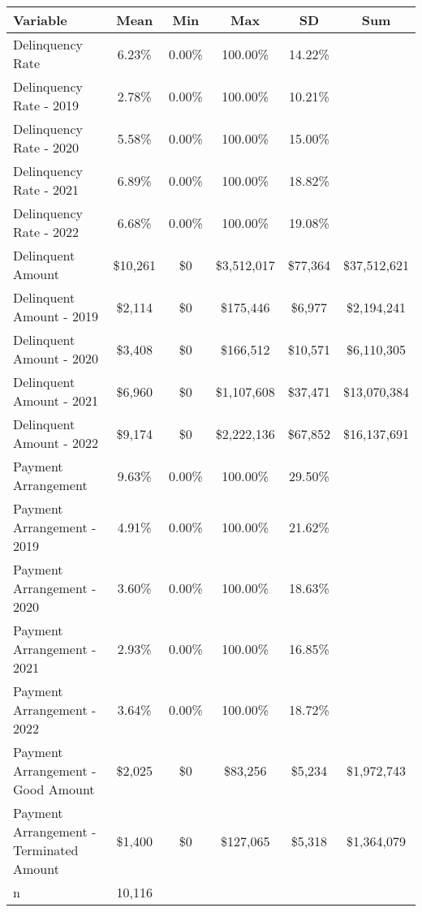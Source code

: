 \begin{tabular}{l|c|c|c|c|c}
\toprule 
\midrule 
Variable & Mean & Min & Max & SD & Sum \\
\midrule 
Delinquency Rate & 6.23\% & 0.00\% & 100.00\% & 14.22\% \\
\quad Delinquency Rate - 2019 & 2.78\% & 0.00\% & 100.00\% & 10.21\% \\
\quad Delinquency Rate - 2020 & 5.58\% & 0.00\% & 100.00\% & 15.00\% \\
\quad Delinquency Rate - 2021 & 6.89\% & 0.00\% & 100.00\% & 18.82\% \\
\quad Delinquency Rate - 2022 & 6.68\% & 0.00\% & 100.00\% & 19.08\% \\
\midrule 
Delinquent Amount & \$10,261 & \$0 & \$3,512,017 & \$77,364 & \$37,512,621 \\
\quad Delinquent Amount - 2019 & \$2,114 & \$0 & \$175,446 & \$6,977 & \$2,194,241 \\
\quad Delinquent Amount - 2020 & \$3,408 & \$0 & \$166,512 & \$10,571 & \$6,110,305 \\
\quad Delinquent Amount - 2021 & \$6,960 & \$0 & \$1,107,608 & \$37,471 & \$13,070,384 \\
\quad Delinquent Amount - 2022 & \$9,174 & \$0 & \$2,222,136 & \$67,852 & \$16,137,691 \\
\midrule 
Payment Arrangement & 9.63\% & 0.00\% & 100.00\% & 29.50\% \\
\quad Payment Arrangement - 2019 & 4.91\% & 0.00\% & 100.00\% & 21.62\% \\
\quad Payment Arrangement - 2020 & 3.60\% & 0.00\% & 100.00\% & 18.63\% \\
\quad Payment Arrangement - 2021 & 2.93\% & 0.00\% & 100.00\% & 16.85\% \\
\quad Payment Arrangement - 2022 & 3.64\% & 0.00\% & 100.00\% & 18.72\% \\
\quad Payment Arrangement - Good Amount & \$2,025 & \$0 & \$83,256 & \$5,234 & \$1,972,743 \\
\quad Payment Arrangement - Terminated Amount & \$1,400 & \$0 & \$127,065 & \$5,318 & \$1,364,079 \\
\midrule 
n & 10,116 &  &  &  &  \\
\midrule 
\bottomrule 
\end{tabular}
